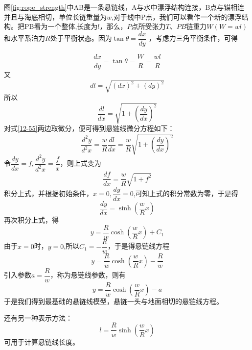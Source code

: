 \documentclass{cumcm}
\begin{document}
图\ref{fig:rope_strength}中AB是一条悬链线，A与水中漂浮结构连接，B点与锚相连并且与海底相切，单位长链重量为$w$,对于线中P点，我们可以看作一个新的漂浮结构。把PB看为一个整体,长度为$l$，那么，$P$点所受张力$T$、$PB$链重力$W(W=wl)$和水平系泊力$R$处于平衡状态。因为$\tan{\theta}=\dfrac{dx}{dy}$ ，考虑力三角平衡条件，可得

\begin{displaymath}
	\dfrac{dx}{dy}=\tan{\theta}=\dfrac{W}{R}=\dfrac{wl}{R}\label{12-55}
\end{displaymath}
又
\begin{displaymath}
	dl=\sqrt{(dx)^2+(dy)^2}
\end{displaymath}
所以
\begin{displaymath}
	\dfrac{dl}{dx}=\sqrt{1+(\frac{dy}{dx})^2}
\end{displaymath}
对式\ref{12-55}两边取微分，便可得到悬链线微分方程如下：
\begin{displaymath}
	\dfrac{d^2y}{d^2x}=\dfrac{w}{R}\dfrac{dl}{dx}=\dfrac{w}{R}\sqrt{1+(\dfrac{dy}{dx})^2}
\end{displaymath}
令$\dfrac{dy}{dx}=f,\dfrac{d^2y}{d^2x}=\dfrac{f}{x}$，则上式变为
\begin{displaymath}
	\dfrac{df}{dx}=\dfrac{w}{R}\sqrt{1+f^2}
\end{displaymath}
积分上式，并根据初始条件，$x=0,\dfrac{dy}{dx}=0$,可知上式的积分常数为零，于是得
\begin{displaymath}
	\dfrac{dy}{dx}=\sinh(\dfrac{w}{R}x)
\end{displaymath}
再次积分上式，得
\begin{displaymath}
	y=\dfrac{R}{w}\cosh(\dfrac{w}{R}x)+C_1
\end{displaymath}
由于$x=0$时，$y=0$,所以$C_1=-\dfrac{R}{w}$，于是得悬链线方程
\begin{displaymath}
	y=\dfrac{R}{w}\cosh(\dfrac{w}{R}x)-\dfrac{R}{w}
\end{displaymath}
引入参数$a=\dfrac{R}{w}$，称为悬链线参数，则有
\begin{equation}
	y=\dfrac{R}{w}\cosh(\dfrac{w}{R}x)-a
	\label{eq:chain_basic}
\end{equation}
于是我们得到最基础的悬链线模型，悬链一头与地面相切的悬链线方程。\par 
还有另一种表示方法：
\begin{equation}
l=\dfrac{R}{w}\sinh(\dfrac{w}{R}x)
\label{eq:chain_length}
\end{equation}
可用于计算悬链线长度。
\end{document}
